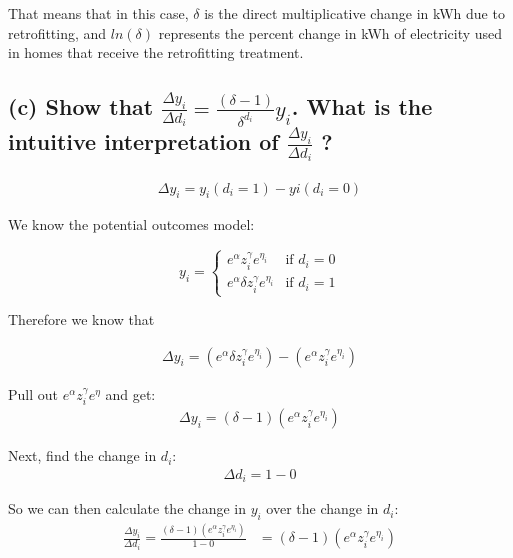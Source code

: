 \documentclass{article}
\begin{document}
That means that in this case, $\delta$ is the direct multiplicative change in kWh due to retrofitting, and $ln(\delta)$ represents the percent change in kWh of electricity used in homes that receive the retrofitting treatment. 

\subsection*{(c) Show that $\frac{\Delta y_i}{\Delta d_i} = \frac{(\delta - 1)}{\delta^{d_i}} y_i$. What is the intuitive interpretation of $\frac{\Delta y_i}{\Delta d_i}$ ?}

\begin{align}
\Delta y_i = y_i (d_i = 1) - yi (d_i = 0)
\end{align}

We know the potential outcomes model: 

\[
y_i = \begin{cases} 
      e^{\alpha} z_i^{\gamma} e^{\eta_i} & \text{if } d_i = 0 \\
      e^{\alpha} \delta z_i^{\gamma}  e^{\eta_i} & \text{if } d_i = 1 
   \end{cases}
\]

Therefore we know that 

\begin{align}
\Delta y_i = (e^{\alpha} \delta z_i^{\gamma}  e^{\eta_i}) - (e^{\alpha} z_i^{\gamma} e^{\eta_i})
\end{align}

Pull out $e^{\alpha} z_i^{\gamma} e^{\eta}$ and get: \\

\begin{align}
\Delta y_i = (\delta - 1) (e^{\alpha} z_i^{\gamma} e^{\eta_i})
\end{align}

Next, find the change in $d_i$: \\

\begin{align}
    \Delta d_i = 1 - 0
\end{align}

So we can then calculate the change in $y_i$ over the change in $d_i$: \\

\begin{align}
    \frac{\Delta y_i}{\Delta d_i} = \frac{(\delta - 1) (e^{\alpha} z_i^{\gamma} e^{\eta_i})}{1 - 0}
    & = (\delta - 1) (e^{\alpha} z_i^{\gamma} e^{\eta_i})
\end{align}
\end{document}
